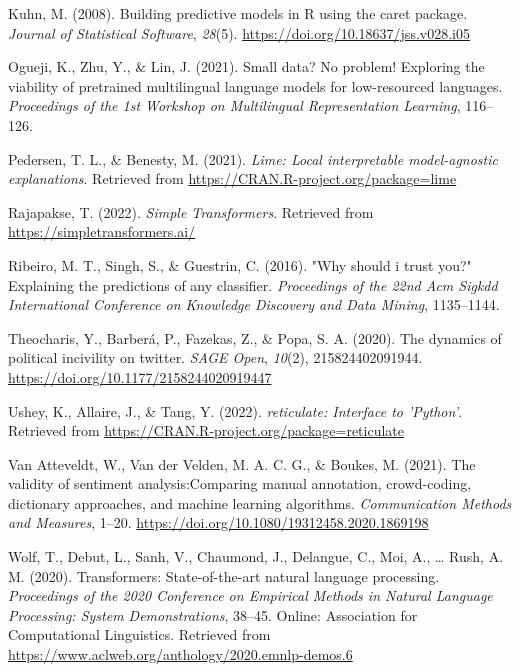 \documentclass[
  english,
  man,floatsintext]{apa6}
\newlength{\cslhangindent}
\newenvironment{cslreferences}%
  {\setlength{\parindent}{0pt}%
  \everypar{\setlength{\hangindent}{\cslhangindent}}\ignorespaces}%
  {\par}
\begin{document}
\begin{cslreferences}
\leavevmode\hypertarget{ref-kuhn:2008:BPM}{}%
Kuhn, M. (2008). Building predictive models in R using the caret package. \emph{Journal of Statistical Software}, \emph{28}(5). \url{https://doi.org/10.18637/jss.v028.i05}

\leavevmode\hypertarget{ref-ogueji2021small}{}%
Ogueji, K., Zhu, Y., \& Lin, J. (2021). Small data? No problem! Exploring the viability of pretrained multilingual language models for low-resourced languages. \emph{Proceedings of the 1st Workshop on Multilingual Representation Learning}, 116--126.

\leavevmode\hypertarget{ref-lime}{}%
Pedersen, T. L., \& Benesty, M. (2021). \emph{Lime: Local interpretable model-agnostic explanations}. Retrieved from \url{https://CRAN.R-project.org/package=lime}

\leavevmode\hypertarget{ref-simpletransformers}{}%
Rajapakse, T. (2022). \emph{Simple Transformers}. Retrieved from \url{https://simpletransformers.ai/}

\leavevmode\hypertarget{ref-ribeiro2016should}{}%
Ribeiro, M. T., Singh, S., \& Guestrin, C. (2016). "Why should i trust you?" Explaining the predictions of any classifier. \emph{Proceedings of the 22nd Acm Sigkdd International Conference on Knowledge Discovery and Data Mining}, 1135--1144.

\leavevmode\hypertarget{ref-theocharis:2020:DPI}{}%
Theocharis, Y., Barberá, P., Fazekas, Z., \& Popa, S. A. (2020). The dynamics of political incivility on twitter. \emph{SAGE Open}, \emph{10}(2), 215824402091944. \url{https://doi.org/10.1177/2158244020919447}

\leavevmode\hypertarget{ref-reticulate}{}%
Ushey, K., Allaire, J., \& Tang, Y. (2022). \emph{reticulate: Interface to 'Python'}. Retrieved from \url{https://CRAN.R-project.org/package=reticulate}

\leavevmode\hypertarget{ref-atteveldt:2021:VSA}{}%
Van Atteveldt, W., Van der Velden, M. A. C. G., \& Boukes, M. (2021). The validity of sentiment analysis:Comparing manual annotation, crowd-coding, dictionary approaches, and machine learning algorithms. \emph{Communication Methods and Measures}, 1--20. \url{https://doi.org/10.1080/19312458.2020.1869198}

\leavevmode\hypertarget{ref-wolf-etal-2020-transformers}{}%
Wolf, T., Debut, L., Sanh, V., Chaumond, J., Delangue, C., Moi, A., \ldots{} Rush, A. M. (2020). Transformers: State-of-the-art natural language processing. \emph{Proceedings of the 2020 Conference on Empirical Methods in Natural Language Processing: System Demonstrations}, 38--45. Online: Association for Computational Linguistics. Retrieved from \url{https://www.aclweb.org/anthology/2020.emnlp-demos.6}
\end{cslreferences}

\endgroup
\end{document}
